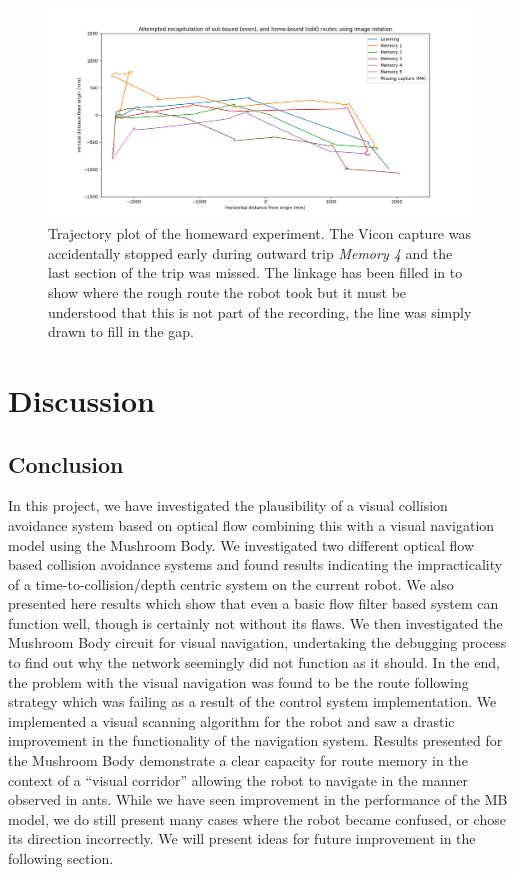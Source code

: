 \documentclass[a4paper,12pt]{article}
\begin{document}
\begin{figure}
 \centering
  \includegraphics[width=\textwidth]{Homeward}
  \caption{
    \label{fig:home} Trajectory plot of the homeward experiment. The Vicon capture was accidentally stopped
    early during outward trip \textit{Memory 4} and the last section of the trip was missed. The linkage has
    been filled in to show where the rough route the robot took but it must be understood that this is not
    part of the recording, the line was simply drawn to fill in the gap. 
  }
\end{figure}

\newpage

\section{ Discussion } \label{sec:discussion}
\subsection{Conclusion}
In this project, we have investigated the plausibility of a visual collision avoidance system based on optical flow combining
this with a visual navigation model using the Mushroom Body. We investigated two different optical flow based collision avoidance
systems and found results indicating the impracticality of a time-to-collision/depth centric system on the current robot. We
also presented here results which show that even a basic flow filter based system can function well, though is certainly
not without its flaws. We then investigated the Mushroom Body circuit for visual navigation, undertaking the debugging
process to find out why the network seemingly did not function as it should. In the end, the problem with the visual
navigation was found to be the route following strategy which was failing as a result of the control system implementation. We
implemented a visual scanning algorithm for the robot and saw a drastic improvement in the functionality of the navigation
system. Results presented for the Mushroom Body demonstrate a clear capacity for route memory in the context of a ``visual
corridor'' allowing the robot to navigate in the manner observed in ants. While we have seen improvement in the performance
of the MB model, we do still present many cases where the robot became confused, or chose its direction incorrectly. We will
present ideas for future improvement in the following section.
\end{document}

